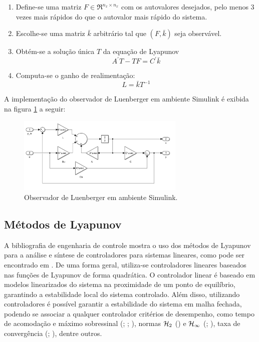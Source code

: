 \begin{enumerate}
  \item Define-se uma matriz $F \in \Re^{n_{x} \times n_{x}}$ com os autovalores desejados, pelo menos 3 vezes mais rápidos do que o autovalor mais rápido do sistema.
  \item Escolhe-se uma matriz $\bar{k}$ arbitrário tal que $(F,\bar{k})$ seja observável.
  \item {Obtém-se a solução única $T$ da equação de Lyapunov
  \begin{equation} \label{eq:lyapunov}
      A^'T-TF=C^'\bar{k}
  \end{equation}}
  \item {Computa-se o ganho de realimentação:
  \begin{equation} \label{eq:ganho}
      L=\bar{k}T^{-1}
  \end{equation}}
\end{enumerate} 

A implementação do observador de Luenberger em ambiente Simulink é exibida na figura \ref{fig:luemberger_simulink} a seguir:

\FloatBarrier
\begin{figure}[htbp]
  \begin{centering}
    \includegraphics[width=8cm]{img/luenberger_simulink.png}
    \caption{Observador de Luenberger em ambiente Simulink.} 
    \label{fig:luemberger_simulink}
  \end{centering}
\end{figure}
\FloatBarrier

\subsection{Métodos de Lyapunov}
A bibliografia de engenharia de controle mostra o uso dos métodos de Lyapunov para a análise e síntese de controladores para sistemas lineares, como pode ser encontrado em \cite{ChenLSTI}. De uma forma geral, utiliza-se controladores lineares baseados nas funções de Lyapunov de forma quadrática. O controlador linear é baseado em modelos linearizados do sistema na proximidade de um ponto de equilíbrio, garantindo a estabilidade local do sistema controlado. Além disso, utilizando controladores é possível garantir a estabilidade do sistema em malha fechada, podendo se associar a qualquer controlador critérios de desempenho, como tempo de acomodação e máximo sobressinal (\cite{Hang1987RefinementsOT}; \cite{601347}; \cite{1049598}), normas $\mathcal{H}_2$ (\cite{4789992}) e $\mathcal{H}_\infty$ (\cite{Petersen}; \cite{Wang1992RobustCO}), taxa de convergência (\cite{Elia2001StabilizationInformation}; \cite{LORIA200213}), dentre outros.

